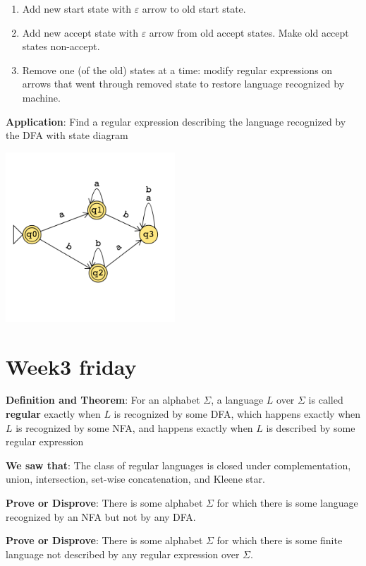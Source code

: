 \documentclass[12pt, oneside]{article}
\begin{document}
\begin{enumerate}
\item Add new start state with $\varepsilon$ arrow to old start state.
\item Add new accept state with $\varepsilon$ arrow from old accept states.  Make old accept states
non-accept.
\item Remove one (of the old) states at a time: modify regular expressions on arrows that went through removed
state to restore language recognized by machine.
\end{enumerate}

{\bf Application}: Find a regular expression describing the language recognized by the DFA with 
state diagram

\includegraphics[width=2.5in]{../../resources/machines/Lect6NFA3.png}

\vfill
 \vfill
\section*{Week3 friday}


{\bf Definition and Theorem}: For an alphabet $\Sigma$, a language $L$ over $\Sigma$ is called {\bf regular}
exactly when $L$ is recognized by some DFA, which happens exactly when $L$ is recognized by some NFA, 
and happens exactly when $L$ is described by some regular expression

{\bf We saw that}: The class of regular languages is closed under complementation, union, 
intersection, set-wise concatenation, and Kleene star.

{\bf Prove or Disprove}: There is some alphabet $\Sigma$ for which there is 
some language recognized by an NFA but not by any DFA.

\vfill

{\bf Prove or Disprove}: There is some alphabet $\Sigma$ for which there is 
some finite language not described by any regular expression over $\Sigma$.
\end{document}
